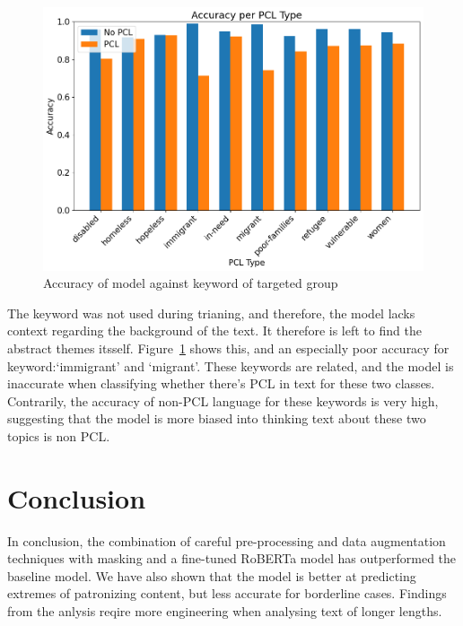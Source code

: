 \documentclass[11pt,a4paper]{article}
\begin{document}
\begin{figure}[H]
    \centering
    \includegraphics[width=\linewidth]{figures/accuracy_per_pcl_type_keyword.png}
    \caption{Accuracy of model against keyword of targeted group}
    \label{fig:accuracy-keyword}
\end{figure}


The keyword was not used during trianing, and therefore, the model lacks context regarding the background of the text. It therefore is left to find the abstract themes itsself. Figure~\ref{fig:accuracy-keyword} shows this, and an especially poor accuracy for keyword:`immigrant' and `migrant'. These keywords are related, and the model is inaccurate when classifying whether there's PCL in text for these two classes. Contrarily, the accuracy of non-PCL language for these keywords is very high, suggesting that the model is more biased into thinking text about these two topics is non PCL.

\section{Conclusion}

In conclusion, the combination of careful pre-processing and data augmentation techniques with masking and a fine-tuned RoBERTa model has outperformed the baseline model. We have also shown that the model is better at predicting extremes of patronizing content, but less accurate for borderline cases. Findings from the anlysis reqire more engineering when analysing text of longer lengths.


\clearpage

\appendix



\end{document}
